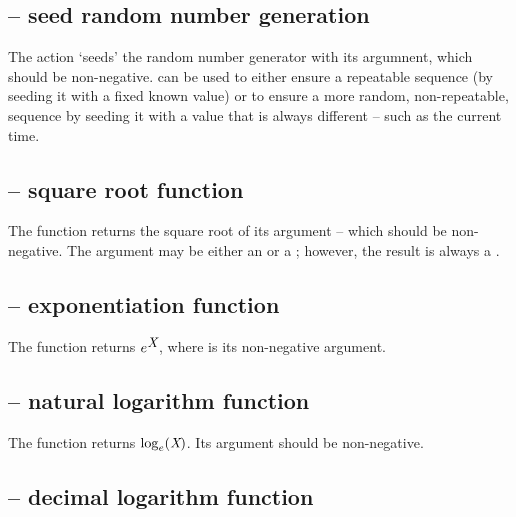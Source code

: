 \subsection{ -- seed random number generation}
\label{arith:srand}

     
The  action `seeds' the random number generator with its  argumnent, which should be non-negative.  can be used to either ensure a repeatable sequence (by seeding it with a fixed known value) or to ensure a more random, non-repeatable, sequence by seeding it with a value that is always different -- such as the current time.

\subsection{ -- square root function}
\label{arith:sqrt}

     
The  function returns the square root of its argument -- which should be non-negative. The argument may be either an  or a ; however, the result is always a .

\subsection{ -- exponentiation function}
\label{arith:exp}

     
The  function returns $e^{{\mbox{\rm\em X}}}$, where  is its non-negative argument.
        
\subsection{ -- natural logarithm function}
\label{arith:log}

     
The  function returns $\log_e({{\mbox{\rm\em X}})}$. Its argument should be non-negative.

\subsection{ -- decimal logarithm function}
\label{arith:log10}

